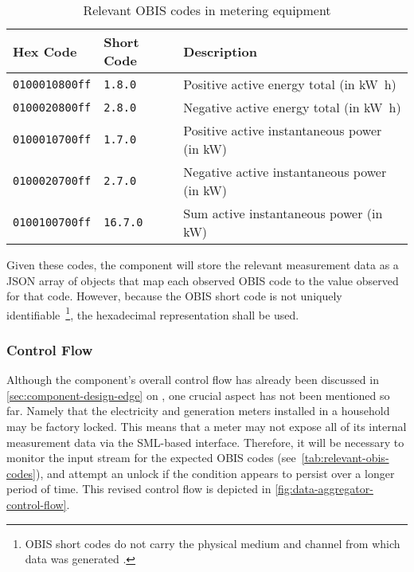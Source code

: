 \begin{table}[hbt]
	\centering
  	\begin{tabularx}{\textwidth}{|l|l|X|}
		\hline
		\textbf{Hex Code} & \textbf{Short Code} & \textbf{Description} \\
	    \hline
	    \texttt{0100010800ff} & \texttt{1.8.0} & Positive active energy total (in \si{\kilo\watt\hour}) \\
	    	\texttt{0100020800ff} & \texttt{2.8.0} & Negative active energy total (in \si{\kilo\watt\hour}) \\
	    \texttt{0100010700ff} & \texttt{1.7.0} & Positive active instantaneous power (in \si{\kilo\watt}) \\
	    \texttt{0100020700ff} & \texttt{2.7.0} & Negative active instantaneous power (in \si{\kilo\watt}) \\
	    	\texttt{0100100700ff} & \texttt{16.7.0} & Sum active instantaneous power (in \si{\kilo\watt}) \\
	    	\hline
	\end{tabularx}
  	\caption{Relevant \acs{OBIS} codes in metering equipment}
  	\label{tab:relevant-obis-codes}
\end{table}

\FloatBarrier

Given these codes, the component will store the relevant measurement data as a \acs{JSON} array of objects that map each observed \acs{OBIS} code to the value observed for that code. However, because the \acs{OBIS} short code is not uniquely identifiable~\footnote{\ac{OBIS} short codes do not carry the physical medium and channel from which data was generated \cite{promoticObis}.}, the hexadecimal representation shall be used.


\subsubsection{Control Flow}
\label{sec:data-aggregator-control-flow}

Although the component's overall control flow has already been discussed in \autoref{sec:component-design-edge} on , one crucial aspect has not been mentioned so far. Namely that the electricity and generation meters installed in a household may be factory locked. This means that a meter may not expose all of its internal measurement data via the \ac{SML}-based interface. Therefore, it will be necessary to monitor the input stream for the expected \acs{OBIS} codes (see~\autoref{tab:relevant-obis-codes}), and attempt an unlock if the condition appears to persist over a longer period of time. This revised control flow is depicted in \autoref{fig:data-aggregator-control-flow}.

